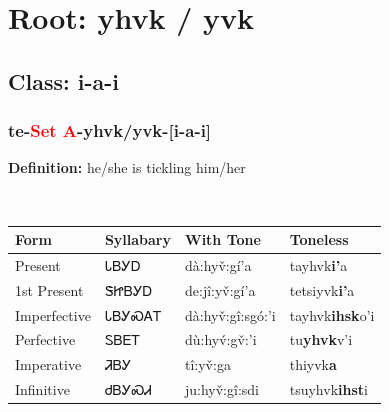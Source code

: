 \needspace{4in}
\section*{Root: yhvk / yvk}
\nopagebreak
{}
\needspace{3in}
\subsection*{Class: i-a-i}
\nopagebreak
\needspace{2in}
\subsubsection*{te{-}\textcolor{Red}{Set A}{-}\textbf{yhvk/yvk}{-}[i-a-i]}
\nopagebreak
\textbf{Definition: } he/she is tickling him/her
\\[0.5em]
\begin{tabularx}{\textwidth}{l X X X}%
\toprule%
\textbf{Form}&\textbf{Syllabary}&\textbf{With Tone}&\textbf{Toneless}\\%
\midrule%
Present&ᏓᏴᎩᎠ&dà:hyv̌:gí’a&tayhvk\textbf{i'}a\\%
1st Present&ᏕᏥᏴᎩᎠ&de:jî:yv̌:gí’a&tetsiyvk\textbf{i'}a\\%
Imperfective&ᏓᏴᎩᏍᎪᎢ&dà:hyv̌:gî:sgó:’i&tayhvk\textbf{ihsk}o'i\\%
Perfective&ᏚᏴᎬᎢ&dù:hyv́:gv̌:’i&tu\textbf{yhvk}v'i\\%
Imperative&ᏘᏴᎩ&tî:yv̌:ga&thiyvk\textbf{a}\\%
Infinitive&ᏧᏴᎩᏍᏗ&ju:hyv̌:gî:sdi&tsuyhvk\textbf{ihst}i\\%
\bottomrule%
\end{tabularx}
\\[1em]